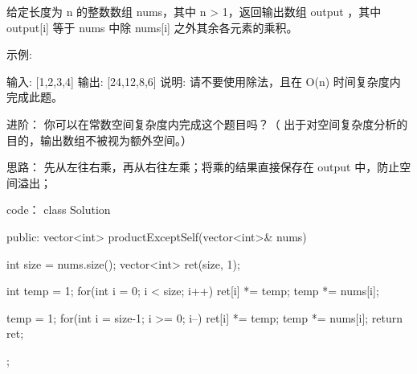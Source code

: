 给定长度为 n 的整数数组 nums，其中 n > 1，返回输出数组 output ，其中 output[i] 等于 nums 中除 nums[i] 之外其余各元素的乘积。

示例:

输入: [1,2,3,4]
输出: [24,12,8,6]
说明: 请不要使用除法，且在 O(n) 时间复杂度内完成此题。

进阶：
你可以在常数空间复杂度内完成这个题目吗？（ 出于对空间复杂度分析的目的，输出数组不被视为额外空间。）































思路：
先从左往右乘，再从右往左乘；将乘的结果直接保存在 output 中，防止空间溢出；



























code：
class Solution {
public:
    vector<int> productExceptSelf(vector<int>& nums) {
        int size = nums.size();
        vector<int> ret(size, 1);
        
        int temp = 1;
        for(int i = 0; i < size; i++)
        {
            ret[i] *= temp;
            temp *= nums[i];
        }
        
        temp = 1;
        for(int i = size-1; i >= 0; i--)
        {
            ret[i] *= temp;
            temp *= nums[i];
        }
        return ret;
    }
};